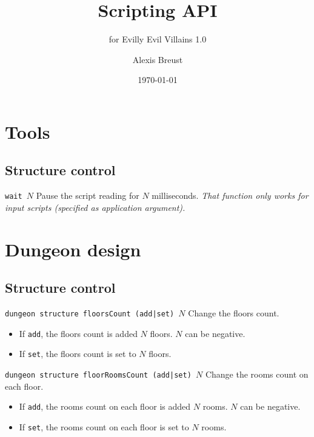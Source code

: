 \documentclass[10pt,a4paper]{scrartcl}
\title{Scripting API}
\subtitle{for Evilly Evil Villains 1.0}
\author{Alexis Breust}
\date{\today}
\newenvironment{apiCode}[1]
{ \begin{lrbox}{\mybox} \begin{minipage}{0.9\textwidth} {\color{Mahogany} \small\texttt{#1}} \vspace{8pt} \newline }
{ \end{minipage} \end{lrbox}\fbox{\usebox{\mybox}} \newline\vspace{4pt}\newline }
\begin{document}
\maketitle

\section{Tools}
\subsection{Structure control}
\begin{apiCode}{wait $N$}
Pause the script reading for $N$ milliseconds.\newline
\textit{That function only works for input scripts (specified as application argument).}
\end{apiCode}

\section{Dungeon design}
\subsection{Structure control}
\begin{apiCode}{dungeon structure floorsCount (add|set) $N$}
Change the floors count.
\begin{itemize}
\itemsep 0em
\item If \verb#add#, the floors count is added $N$ floors. $N$ can be negative.
\item If \verb#set#, the floors count is set to $N$ floors.
\end{itemize}
\end{apiCode}
\begin{apiCode}{dungeon structure floorRoomsCount (add|set) $N$}
Change the rooms count on each floor.
\begin{itemize}
\itemsep 0em
\item If \verb#add#, the rooms count on each floor is added $N$ rooms. $N$ can be negative.
\item If \verb#set#, the rooms count on each floor is set to $N$ rooms.
\end{itemize}
\end{apiCode}
\end{document}

